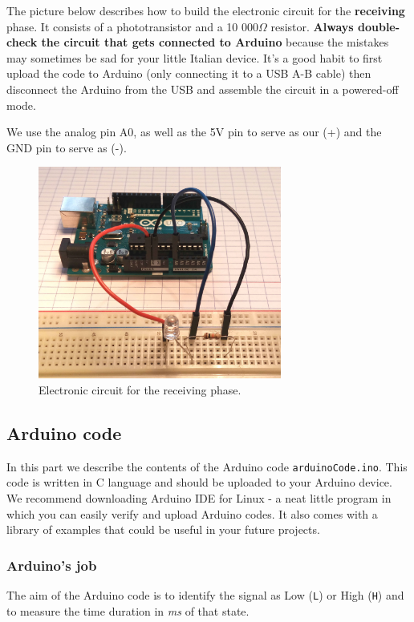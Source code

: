 \documentclass[12pt]{report}
\begin{document}
The picture below describes how to build the electronic circuit for the \textbf{receiving} phase. It consists of a phototransistor and a 10 000$\Omega$ resistor. \textbf{Always double-check the circuit that gets connected to Arduino} because the mistakes may sometimes be sad for your little Italian device. It's a good habit to first upload the code to Arduino (only connecting it to a USB A-B cable) then disconnect the Arduino from the USB and assemble the circuit in a powered-off mode.

We use the analog pin A0, as well as the 5V pin to serve as our (+) and the GND pin to serve as (-).

\begin{figure}[H]
\centering\includegraphics[width=8cm]{receive_circuit}
\caption{Electronic circuit for the receiving phase.}				
\label{fig:receiving_circuit}
\end{figure}




\subsection{Arduino code}

In this part we describe the contents of the Arduino code \verb|arduinoCode.ino|. This code is written in C language and should be uploaded to your Arduino device. We recommend downloading Arduino IDE for Linux - a neat little program in which you can easily verify and upload Arduino codes. It also comes with a library of examples that could be useful in your future projects.

\subsubsection{Arduino's job}

The aim of the Arduino code is to identify the signal as Low (\verb|L|) or High (\verb|H|) and to measure the time duration in \textit{ms} of that state.
\end{document}

